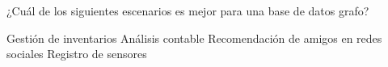\question[1] ¿Cuál de los siguientes escenarios es mejor para una base de datos grafo?
\begin{choices}
\choice Gestión de inventarios
\choice Análisis contable
\CorrectChoice Recomendación de amigos en redes sociales
\choice Registro de sensores
\end{choices}